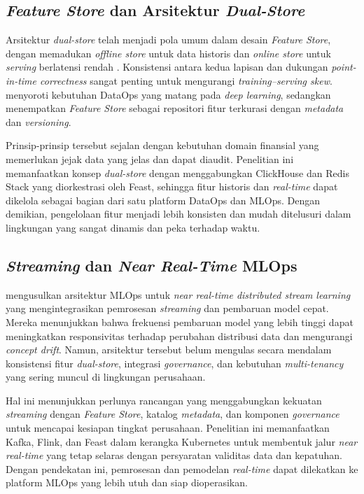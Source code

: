 \subsection{\textit{Feature Store} dan Arsitektur \textit{Dual-Store}}

Arsitektur \textit{dual-store} telah menjadi pola umum dalam desain \textit{Feature Store}, dengan memadukan \textit{offline store} untuk data historis dan \textit{online store} untuk \textit{serving} berlatensi rendah \autocite{li2023managed}. Konsistensi antara kedua lapisan dan dukungan \textit{point-in-time correctness} sangat penting untuk mengurangi \textit{training--serving skew}. \textcite{munappy2022data} menyoroti kebutuhan DataOps yang matang pada \textit{deep learning}, sedangkan \textcite{lamer2024data} menempatkan \textit{Feature Store} sebagai repositori fitur terkurasi dengan \textit{metadata} dan \textit{versioning}.

Prinsip-prinsip tersebut sejalan dengan kebutuhan domain finansial yang memerlukan jejak data yang jelas dan dapat diaudit. Penelitian ini memanfaatkan konsep \textit{dual-store} dengan menggabungkan ClickHouse dan Redis Stack yang diorkestrasi oleh Feast, sehingga fitur historis dan \textit{real-time} dapat dikelola sebagai bagian dari satu platform DataOps dan MLOps. Dengan demikian, pengelolaan fitur menjadi lebih konsisten dan mudah ditelusuri dalam lingkungan yang sangat dinamis dan peka terhadap waktu.

\subsection{\textit{Streaming} dan \textit{Near Real-Time} MLOps}

\textcite{rodrigues2025architecture} mengusulkan arsitektur MLOps untuk \textit{near real-time distributed stream learning} yang mengintegrasikan pemrosesan \textit{streaming} dan pembaruan model cepat. Mereka menunjukkan bahwa frekuensi pembaruan model yang lebih tinggi dapat meningkatkan responsivitas terhadap perubahan distribusi data dan mengurangi \textit{concept drift}. Namun, arsitektur tersebut belum mengulas secara mendalam konsistensi fitur \textit{dual-store}, integrasi \textit{governance}, dan kebutuhan \textit{multi-tenancy} yang sering muncul di lingkungan perusahaan.

Hal ini menunjukkan perlunya rancangan yang menggabungkan kekuatan \textit{streaming} dengan \textit{Feature Store}, katalog \textit{metadata}, dan komponen \textit{governance} untuk mencapai kesiapan tingkat perusahaan. Penelitian ini memanfaatkan Kafka, Flink, dan Feast dalam kerangka Kubernetes untuk membentuk jalur \textit{near real-time} yang tetap selaras dengan persyaratan validitas data dan kepatuhan. Dengan pendekatan ini, pemrosesan dan pemodelan \textit{real-time} dapat dilekatkan ke platform MLOps yang lebih utuh dan siap dioperasikan.

